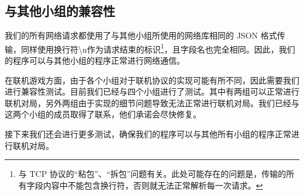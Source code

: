 \documentclass[UTF8]{ctexart}
\begin{document}
\subsection{与其他小组的兼容性}
我们的所有网络请求都使用了与其他小组所使用的网络库相同的 JSON 格式传输，同样使用换行符\textbackslash n作为请求结束的标识\footnote{与 TCP 协议的“粘包”、“拆包”问题有关。此处可能存在的问题是，传输的所有字段内容中不能包含换行符，否则就无法正常解析每一次请求。}，且字段名也完全相同。因此，我们的程序可以与其他小组的程序正常进行网络通信。\par
在联机游戏方面，由于各个小组对于联机协议的实现可能有所不同，因此需要我们进行兼容性测试。目前我们已经与四个小组进行了测试。其中有两组可以正常进行联机对局，另外两组由于实现的细节问题导致无法正常进行联机对局。我们已经与这两个小组的成员取得了联系，他们承诺会尽快修复。\par
接下来我们还会进行更多测试，确保我们的程序可以与其他所有小组的程序正常进行联机对局。
\end{document}
